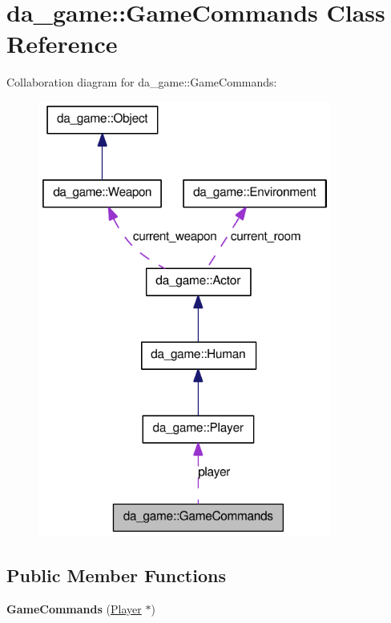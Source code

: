 \hypertarget{classda__game_1_1GameCommands}{
\section{da\_\-game::GameCommands Class Reference}
\label{classda__game_1_1GameCommands}
}
Collaboration diagram for da\_\-game::GameCommands:\nopagebreak
\begin{figure}[H]
\begin{center}
\leavevmode
\includegraphics[width=274pt]{classda__game_1_1GameCommands__coll__graph}
\end{center}
\end{figure}
\subsection*{Public Member Functions}
\begin{DoxyCompactItemize}
\item 
\hypertarget{classda__game_1_1GameCommands_a7f93d626b2cf6b976c49da0a038ef2ea}{
{\bfseries GameCommands} (\hyperlink{classda__game_1_1Player}{Player} $\ast$)}
\label{classda__game_1_1GameCommands_a7f93d626b2cf6b976c49da0a038ef2ea}

\end{DoxyCompactItemize}
